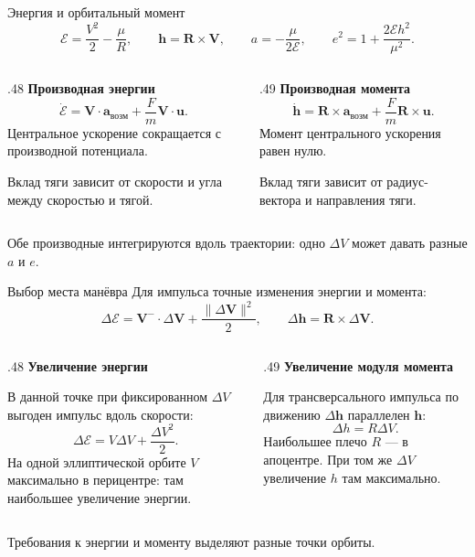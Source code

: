 \documentclass[11pt,aspectratio=169,t]{beamer}
\newcommand{\eqcompact}{\fontsize{10}{12}\selectfont}
\newcommand{\derivationmathspacing}{%
  \setlength{\abovedisplayskip}{2pt}%
  \setlength{\belowdisplayskip}{3pt}%
  \setlength{\abovedisplayshortskip}{2pt}%
  \setlength{\belowdisplayshortskip}{2pt}%
  \setlength{\jot}{2pt}}
\newcommand{\vect}[1]{\boldsymbol{#1}}
\begin{document}
\begin{frame}{Энергия и орбитальный момент}
\relax\derivationmathspacing
{\eqcompact\derivationmathspacing
\[
 \mathcal E=\frac{V^2}{2}-\frac\mu R,\qquad
 \vect h=\vect R\times\vect V,\qquad
 a=-\frac\mu{2\mathcal E},\qquad
 e^2=1+\frac{2\mathcal E h^2}{\mu^2}.
\]
}
\begin{columns}[T,onlytextwidth]
\begin{column}{.48\textwidth}
\textbf{Производная энергии}
{\eqcompact\derivationmathspacing
\[
 \dot{\mathcal E}
 =\vect V\cdot\vect a_{\text{возм}}+\frac Fm\vect V\cdot\vect u.
\]
}
Центральное ускорение сокращается с производной потенциала.
\par\smallskip
Вклад тяги зависит от скорости и угла между скоростью и тягой.
\end{column}
\begin{column}{.49\textwidth}
\textbf{Производная момента}
{\eqcompact\derivationmathspacing
\[
 \dot{\vect h}
 =\vect R\times\vect a_{\text{возм}}+\frac Fm\vect R\times\vect u.
\]
}
Момент центрального ускорения равен нулю.
\par\smallskip
Вклад тяги зависит от радиус-вектора и направления тяги.
\end{column}
\end{columns}
\smallskip
Обе производные интегрируются вдоль траектории: одно $\Delta V$ может давать разные $a$ и $e$.
\end{frame}

\begin{frame}{Выбор места манёвра}
\relax\derivationmathspacing
Для импульса точные изменения энергии и момента:
{\eqcompact\derivationmathspacing
\[
 \Delta\mathcal E=\vect V^-\cdot\Delta\vect V
                   +\frac{\|\Delta\vect V\|^2}{2},\qquad
 \Delta\vect h=\vect R\times\Delta\vect V.
\]
}
\begin{columns}[T,onlytextwidth]
\begin{column}{.48\textwidth}
\textbf{Увеличение энергии}
\par\smallskip
В данной точке при фиксированном $\Delta V$ выгоден импульс вдоль скорости:
{\eqcompact\derivationmathspacing
\[
 \Delta\mathcal E=V\Delta V+\frac{\Delta V^2}{2}.
\]
}
На одной эллиптической орбите $V$ максимально в перицентре: там наибольшее увеличение энергии.
\end{column}
\begin{column}{.49\textwidth}
\textbf{Увеличение модуля момента}
\par\smallskip
Для трансверсального импульса по движению $\Delta\vect h$ параллелен $\vect h$:
{\eqcompact\derivationmathspacing
\[
 \Delta h=R\Delta V.
\]
}
Наибольшее плечо $R$ --- в апоцентре. При том же $\Delta V$ увеличение $h$ там максимально.
\end{column}
\end{columns}
\smallskip
Требования к энергии и моменту выделяют разные точки орбиты.
\end{frame}
\end{document}
